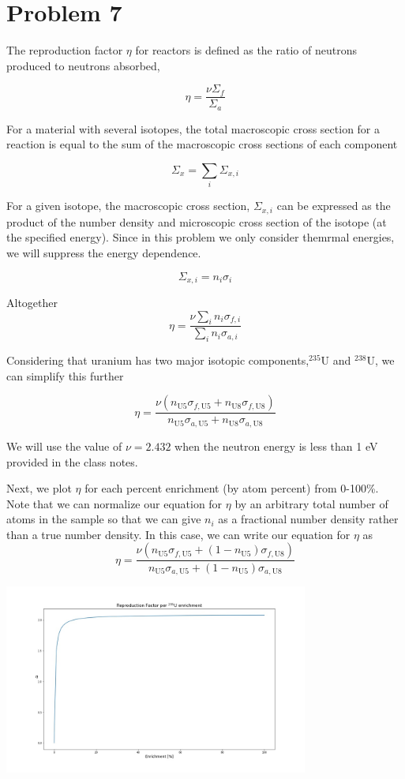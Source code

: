 \documentclass{article}
\begin{document}

\section*{Problem 7}

The reproduction factor $\eta$ for reactors is defined as the ratio of neutrons produced to neutrons absorbed,

$$ \eta = \frac{\nu \Sigma_f}{\Sigma_a} $$

For a material with several isotopes, the total macroscopic cross section for a reaction is equal to the sum of the macroscopic cross sections of each component

$$ \Sigma_x = \sum_i \Sigma_{x,i} $$

For a given isotope, the macroscopic cross section, $\Sigma_{x,i}$ can be expressed as the product of the number density and microscopic cross section of the isotope (at the specified energy). Since in this problem we only consider themrmal energies, we will suppress the energy dependence.

$$ \Sigma_{x,i} = n_i \sigma_i $$

Altogether
$$ \eta = \frac{\nu \sum_i n_i \sigma_{f,i}}{\sum_i n_i \sigma_{a,i}} $$

Considering that uranium has two major isotopic components,$^{235}\text{U}$ and $^{238}\text{U}$, we can simplify this further

$$ \eta = \frac{\nu (n_{\text{U5}} \sigma_{f,\text{U5}} + n_{\text{U8}} \sigma_{f,\text{U8}})}{ n_{\text{U5}} \sigma_{a,\text{U5}} + n_{\text{U8}} \sigma_{a,\text{U8}}} $$

We will use the value of $\nu = 2.432$ when the neutron energy is less than 1 eV provided in the class notes.

Next, we plot $\eta$ for each percent enrichment (by atom percent) from 0-100\%. Note that we can normalize our equation for $\eta$ by an arbitrary total number of atoms in the sample so that we can give $n_i$ as a fractional number density rather than a true number density. In this case, we can write our equation for $\eta$ as
$$\eta = \frac{\nu (n_{\text{U5}} \sigma_{f,\text{U5}} + (1-n_{\text{U5}}) \sigma_{f,\text{U8}})}{ n_{\text{U5}} \sigma_{a,\text{U5}} + (1-n_{\text{U5}}) \sigma_{a,\text{U8}}} $$

\begin{center}
\includegraphics[width=10cm]{eta_per_enrich}
\end{center}
\end{document}
